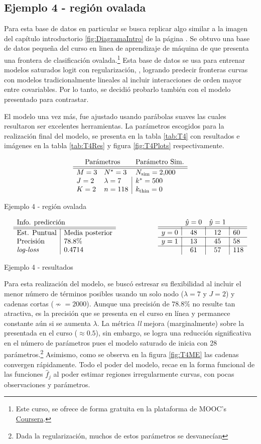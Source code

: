 \documentclass[../Main/Main.tex]{subfiles}
\begin{document}
\subsection*{Ejemplo 4 - región ovalada}
Para esta base de datos en particular se busca replicar algo similar a la imagen del capítulo introductorio \ref{fig:DiagramaIntro} de la página \pageref{fig:DiagramaIntro}. Se obtuvo una base de datos pequeña del curso en linea de aprendizaje de máquina de \citet{andrew2018ml} que presenta una frontera de clasificación ovalada.\footnote{Este curso, se ofrece de forma gratuita en la plataforma de MOOC's \href{https://www.coursera.org/learn/machine-learning}{Coursera}.} Esta base de datos se usa para entrenar modelos saturados logit con regularización, \citet{hastie2008elements}, logrando predecir fronteras curvas con modelos tradicionalmente lineales al incluir interacciones de orden mayor entre covariables. Por lo tanto, se decidió probarlo también con el modelo presentado para contrastar.

El modelo una vez más, fue ajustado usando parábolas suaves las cuales resultaron ser excelentes herramientas. La parámetros escogidos para la realización final del modelo, se presenta en la tabla \ref{tab:T4} con resultados e imágenes en la tabla \ref{tab:T4Res} y figura \ref{fig:T4Plots} respectivamente.  
\begin{table}[h]
$$\paramsmod{3}{2}{2}{3}{7}{118}{\num{2000}}{500}{0}$$
\caption{Ejemplo 4 - región ovalada}
\label{tab:T4}
\end{table}

\begin{table}[h]
\begin{align*}
\resultados{\text{Media posterior}}{78.8}{0.4714}
\qquad\qquad\qquad
\matconf{48}{12}{60}{13}{45}{58}{61}{57}{118}
\end{align*}
\caption{Ejemplo 4 - resultados}
\label{tab:T4Res}
\end{table}

Para esta realización del modelo, se buscó estresar su flexibilidad al incluir el menor número de términos posibles usando un solo nodo ($\lambda = 7$ y $J = 2$) y cadenas cortas ($\nsim = \num{2000}$). Aunque una precisión de $78.8\%$ no resulte tan atractiva, es la precisión que se presenta en el curso en línea y permanece constante aún si se aumenta $\lambda$. La métrica \textit{ll} mejora (marginalmente) sobre la presentada en el curso ($\approx0.5$), sin embargo, se logra una reducción significativa en el número de parámetros pues el modelo saturado de \citet{andrew2018ml} inicia con 28 parámetros.\footnote{Dada la regularización, muchos de estos parámetros se desvanecían} Asimismo, como se observa en la figura \ref{fig:T4ME} las cadenas convergen rápidamente. Todo el poder del modelo, recae en la forma funcional de las funciones $\hat{f}_j$ al poder estimar regiones irregularmente curvas, con pocas observaciones y parámetros. 
\end{document}
